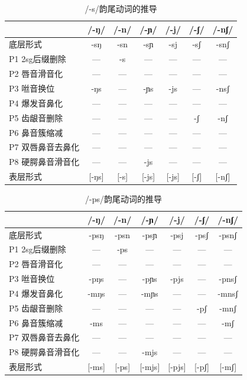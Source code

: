 \begin{table}[H]
\vspace{5pt}
    \centering
    \caption{/-s/韵尾动词的推导}
    \label{deriv-s}
\setlength{\tabcolsep}{4pt}\small
\begin{tabular}{l|cccccc}
\toprule
            & /-ŋ/ & /-n/ & /-ɲ/ & /-j/ & /-ʃ/ & /-nʃ/ \\
\midrule
底层形式 & -sŋ & -sn & -sɲ & -sj & -sʃ & -snʃ \\
P1 2sg后缀删除 & --- & -s & --- & --- & --- & --- \\
P2 唇音滑音化 & --- & --- & --- & --- & --- & --- \\
P3 咝音换位 & -ŋs & --- & -ɲs & -js & --- & -nsʃ \\
P4 爆发音鼻化 & --- & --- & --- & --- & --- & --- \\
P5 齿龈音删除 & --- & --- & --- & --- & -ʃ & -nʃ \\
P6 鼻音簇缩减 & --- & --- & --- & --- & --- & --- \\
P7 双唇鼻音去鼻化 & --- & --- & --- & --- & --- & --- \\
P8 硬腭鼻音滑音化 & --- & --- & -js & --- & --- & --- \\
\midrule
表层形式 & [-ŋs] & [-s] & [-js] & [-js] & [-ʃ] & [-nʃ] \\
\bottomrule
\end{tabular}
\end{table}

\begin{table}[H]
\vspace{5pt}
    \centering
    \caption{/-ps/韵尾动词的推导}
    \label{deriv-ps}
\setlength{\tabcolsep}{4pt}\small
\begin{tabular}{l|cccccc}
\toprule
            & /-ŋ/ & /-n/ & /-ɲ/ & /-j/ & /-ʃ/ & /-nʃ/ \\
\midrule
底层形式 & -psŋ & -psn & -psɲ & -psj & -psʃ & -psnʃ \\
P1 2sg后缀删除 & --- & -ps & --- & --- & --- & --- \\
P2 唇音滑音化 & --- & --- & --- & --- & --- & --- \\
P3 咝音换位 & -pŋs & --- & -pɲs & -pjs & --- & -pnsʃ \\
P4 爆发音鼻化 & -mŋs & --- & -mɲs & --- & --- & -mnsʃ \\
P5 齿龈音删除 & --- & --- & --- & --- & -pʃ & -mnʃ \\
P6 鼻音簇缩减 & -ms & --- & --- & --- & --- & -mʃ \\
P7 双唇鼻音去鼻化 & --- & --- & --- & --- & --- & --- \\
P8 硬腭鼻音滑音化 & --- & --- & -mjs & --- & --- & --- \\
\midrule
表层形式 & [-ms] & [-ps] & [-mjs] & [-pjs] & [-pʃ] & [-mʃ] \\
\bottomrule
\end{tabular}
\end{table}

